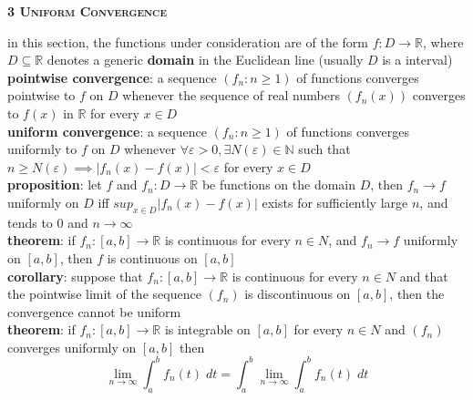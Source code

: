 \documentclass[a4paper]{article}
\newcommand*\abs[1]{\vert #1 \vert}
\begin{document}
\begin{framed}
	\begin{center}
		\textbf{\textsc{3 Uniform Convergence}}
	\end{center}
	in this section, the functions under consideration are of the form $f: D \rightarrow \mathbb{R}$, where $D \subseteq \mathbb{R}$ denotes a generic \textbf{domain} in the Euclidean line (usually $D$ is a interval)\\
	
	\noindent
	\textbf{pointwise convergence}: a sequence $(f_n : n \geq 1)$ of functions converges pointwise to $f$ on $D$ whenever the sequence of real numbers $(f_n(x))$ converges to $f(x)$ in $\mathbb{R}$ for every $x \in D$\\
	
	\noindent
	\textbf{uniform convergence}: a sequence $(f_n : n \geq 1)$ of functions converges uniformly to $f$ on $D$ whenever $\forall \varepsilon > 0, \exists N(\varepsilon) \in \mathbb{N}$ such that $n \geq N(\varepsilon) \implies \abs{f_n(x) - f(x)} < \varepsilon$ for every $x \in D$\\
	
	\noindent
	\textbf{proposition}: let $f$ and $f_n: D \rightarrow \mathbb{R}$ be functions on the domain $D$, then $f_n \rightarrow f$ uniformly on $D$ iff $sup_{x \in D}\abs{f_n(x) - f(x)}$ exists for sufficiently large $n$, and tends to $0$ and $n \rightarrow \infty$\\
	
	\noindent
	\textbf{theorem}: if $f_n: [a, b] \rightarrow \mathbb{R}$ is continuous for every $n \in N$, and $f_n \rightarrow f$ uniformly on $[a, b]$, then $f$ is continuous on $[a, b]$\\
	
	\noindent
	\textbf{corollary}: suppose that $f_n: [a, b] \rightarrow \mathbb{R}$ is continuous for every $n \in N$ and that the pointwise limit of the sequence $(f_n)$ is discontinuous on $[a, b]$, then the convergence cannot be uniform\\
	
	\noindent
	\textbf{theorem}: if $f_n: [a, b] \rightarrow \mathbb{R}$ is integrable on $[a, b]$ for every $n \in N$ and $(f_n)$ converges uniformly on $[a, b]$ then $$\lim_{n \rightarrow \infty} \int_a^b f_n(t) \; dt = \int_a^b \lim_{n \rightarrow \infty} \int_a^b f_n(t) \; dt$$
\end{framed}
\end{document}
